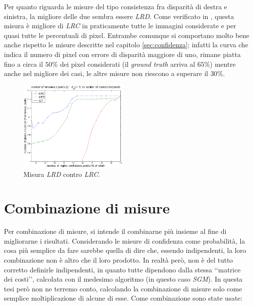 \documentclass[12pt]{report}
\newcommand{\nullpage}{\newpage\null\thispagestyle{empty}}  %
\begin{document}
			\noindent Per quanto riguarda le misure del tipo consistenza fra disparità di destra e sinistra, la migliore delle due sembra essere \textit{LRD}. Come verificato in \cite{mordohai_pami}, questa misura è migliore di \textit{LRC} in praticamente tutte le immagini considerate e per quasi tutte le percentuali di pixel. Entrambe comunque si comportano molto bene anche rispetto le misure descritte nel capitolo \ref{sec:confidenza}; infatti la curva che indica il numero di pixel con errore di disparità maggiore di uno, rimane piatta fino a circa il $50\%$ dei pixel considerati (il \textit{ground truth} arriva al $65\%$) mentre anche nel migliore dei casi, le altre misure non riescono a superare il $30\%$.  
			
			\begin{figure}[H]
				\centering
				\includegraphics[width=0.48\textwidth]{./figures/result7.png}
				\caption{Misura \textit{LRD} contro \textit{LRC}.}
				\label{fig:LRDvsLRC}
			\end{figure}
			

			 
			 \nullpage
			
	
	\chapter{Combinazione di misure}
	\label{sec:combinazione}
	\pagestyle{fancy}
				
		Per combinazione di misure, si intende il combinarne più insieme al fine di migliorarne i risultati. Considerando le misure di confidenza come probabilità, la cosa più semplice da fare sarebbe quella di dire che, essendo indipendenti, la loro combinazione non è altro che il loro prodotto. In realtà però, non è del tutto corretto definirle indipendenti, in quanto tutte dipendono dalla stessa ‘‘matrice dei costi’’, calcolata con il medesimo algoritmo (in questo caso \textit{SGM}). In questa tesi però non ne terremo conto, calcolando la combinazione di misure solo come semplice moltiplicazione di alcune di esse. Come combinazione sono state usate:
		
\end{document}
